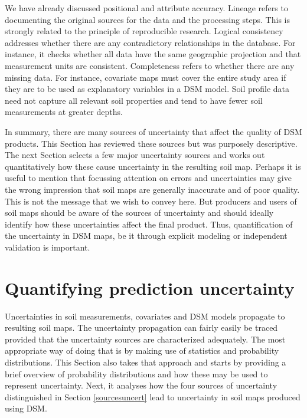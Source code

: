 \documentclass[10pt,b5paper,]{book}
\theoremstyle{definition}
\theoremstyle{definition}
\theoremstyle{definition}
\theoremstyle{remark}
\begin{document}
We have already discussed positional and attribute accuracy. Lineage
refers to documenting the original sources for the data and the
processing steps. This is strongly related to the principle of
reproducible research. Logical consistency addresses whether there are
any contradictory relationships in the database. For instance, it checks
whether all data have the same geographic projection and that
measurement units are consistent. Completeness refers to whether there
are any missing data. For instance, covariate maps must cover the entire
study area if they are to be used as explanatory variables in a DSM
model. Soil profile data need not capture all relevant soil properties
and tend to have fewer soil measurements at greater depths.

In summary, there are many sources of uncertainty that affect the
quality of DSM products. This Section has reviewed these sources but was
purposely descriptive. The next Section selects a few major uncertainty
sources and works out quantitatively how these cause uncertainty in the
resulting soil map. Perhaps it is useful to mention that focussing
attention on errors and uncertainties may give the wrong impression that
soil maps are generally inaccurate and of poor quality. This is not the
message that we wish to convey here. But producers and users of soil
maps should be aware of the sources of uncertainty and should ideally
identify how these uncertainties affect the final product. Thus,
quantification of the uncertainty in DSM maps, be it through explicit
modeling or independent validation is important.

\hypertarget{quantifying-prediction-uncertainty}{%
\section{Quantifying prediction
uncertainty}\label{quantifying-prediction-uncertainty}}

Uncertainties in soil measurements, covariates and DSM models propagate
to resulting soil maps. The uncertainty propagation can fairly easily be
traced provided that the uncertainty sources are characterized
adequately. The most appropriate way of doing that is by making use of
statistics and probability distributions. This Section also takes that
approach and starts by providing a brief overview of probability
distributions and how these may be used to represent uncertainty. Next,
it analyses how the four sources of uncertainty distinguished in Section
\ref{sourcesuncert} lead to uncertainty in soil maps produced using DSM.
\end{document}
